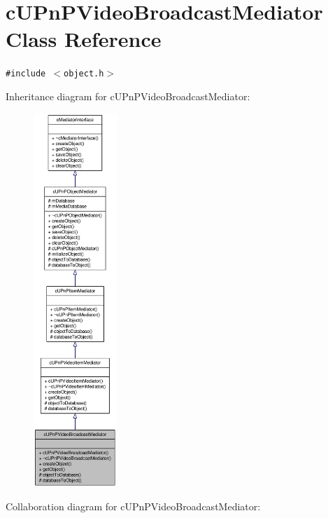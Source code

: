 \hypertarget{classcUPnPVideoBroadcastMediator}{
\section{cUPnPVideoBroadcastMediator Class Reference}
\label{classcUPnPVideoBroadcastMediator}
}
{\tt \#include $<$object.h$>$}

Inheritance diagram for cUPnPVideoBroadcastMediator:\nopagebreak
\begin{figure}[H]
\begin{center}
\leavevmode
\includegraphics[height=400pt]{classcUPnPVideoBroadcastMediator__inherit__graph}
\end{center}
\end{figure}
Collaboration diagram for cUPnPVideoBroadcastMediator:\nopagebreak
